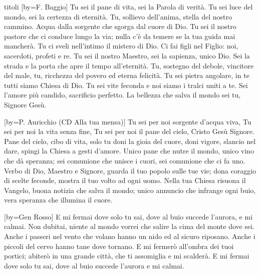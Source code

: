 \begin{songs}{titoli}
[by={F. Baggio}]
\beginverse
Tu sei il pane di vita, sei la Parola di verità.
Tu sei luce del mondo, sei la certezza di eternità.
Tu, sollievo dell'anima, stella del nostro cammino.
Acqua dalla sorgente che sgorga dal cuore di Dio.
\endverse
\beginverse
Tu sei il nostro pastore che ci conduce lungo la via;
nulla c'è da temere se la tua guida mai mancherà.
Tu ci sveli nell'intimo il mistero di Dio.
Ci fai figli nel Figlio: noi, sacerdoti, profeti e re.
\endverse
\beginverse
Tu sei il nostro Maestro, sei la sapienza, unico Dio.
Sei la strada e la porta che apre il tempo all'eternità.
Tu, sostegno del debole, vincitore del male,
tu, ricchezza del povero ed eterna felicità.
\endverse
\beginverse
Tu sei pietra angolare, in te tutti siamo Chiesa di Dio.
Tu sei vite feconda e noi siamo i tralci uniti a te.
Sei l'amore più candido, sacrificio perfetto.
La bellezza che salva il mondo sei tu, Signore Gesù.
\endverse
\endsong

[by={P. Auricchio (CD Alla tua mensa)}]
\beginchorus
Tu sei per noi sorgente d'acqua viva,
Tu sei per noi la vita senza fine,
Tu sei per noi il pane del cielo,
Cristo Gesù Signore.
\endchorus
\beginverse
Pane del cielo, cibo di vita,
solo tu doni la gioia del cuore,
doni vigore, slancio nel dare,
spingi la Chiesa a gesti d'amore.
\endverse
\beginverse
Unico pane che nutre il mondo,
unico vino che dà speranza;
sei comunione che unisce i cuori,
sei comunione che ci fa uno.
\endverse
\beginverse
Verbo di Dio, Maestro e Signore,
guarda il tuo popolo sulle tue vie;
dona coraggio di scelte feconde,
mostra il tuo volto ad ogni uomo.
\endverse
\beginverse
Nella tua Chiesa risuona il Vangelo,
buona notizia che salva il mondo;
unico annuncio che infrange ogni buio,
vera speranza che illumina il cuore.
\endverse
\endsong

[by={Gen Rosso}]
\beginverse
E mi fermai dove solo tu sai, dove al buio succede l'aurora, e mi calmai.
Non dubitai, niente al mondo vorrei che salire la cima del monte dove sei.
\endverse
\beginverse
Anche i passeri nel vento che volano hanno un nido ed al sicuro riposano.
Anche i piccoli del cervo hanno tane dove tornano.
\endverse
\beginchorus
E mi fermerò all'ombra dei tuoi portici;
abiterò in una grande città, che ti assomiglia e mi scalderà. 
\endchorus
\beginverse*
E mi fermai dove solo tu sai, dove al buio succede l'aurora e mi calmai.
\endverse
\endsong


\end{songs}
